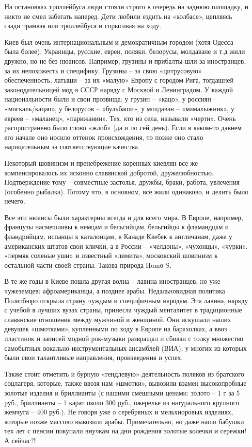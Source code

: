 На остановках троллейбуса люди стояли строго в очередь на заднюю площадку, и
никто не смел забегать наперед. Дети любили ездить на «колбасе», цепляясь сзади
трамвая или троллейбуса и спрыгивая на ходу. 

Киев был очень интернациональным и демократичным городом (хотя Одесса была
более). Украинцы, русские, евреи, поляки, белорусы, молдаване и т.д жили
дружно, но не без нюансов. Например, грузины и прибалты шли за иностранцев, за
их непохожесть и специфику. Грузины – за свою «цитрусовую» обеспеченность,
латыши – за их «малую» Европу с городом Рига, тогдашней законодательницей мод в
СССР наряду с Москвой и Ленинградом. У каждой национальности были и свои
прозвища: у грузин – «кацо», у россиян – «москаль/кацап», у белорусов –
«бульбаши», у молдаван – «мамалыжник», у евреев – «маланец», «парижанин». Тех,
кто из села, называли «черти». Очень распространено было слово «жлоб» (да и по
сей день). Если в каком-то давнем его начале оно носило оттенок происхождения,
то позже оно стало нарицательным за соответствующие качества. 

Некоторый шовинизм и пренебрежение коренных киевлян все же компенсировалось их
исконно славянской добротой, дружелюбностью. Подтверждение тому – совместные
застолья, дружбы, браки, работа, увлечения (особенно рыбалка). Потому что, в
основном, все жили одинаково, и делить было нечего. 

Все эти нюансы были характерны всегда и для всего мира. В Европе, например,
французы насмешливы к немцам и бельгийцам, бельгийцы к фламандцам и
фландрийцам, испанцы к каталонцам, в Канаде Квебек к англичанам, даже у
американских штатов свои клички, а в России – «челдоны», «чухонцы», «чурки»,
«пермяк соленые уши» и известный «лимита», московский шовинизм к остальной
части своей страны. Такова природа Homо S. 

В те же годы в Киеве пошла другая волна – лавина иностранцев, но уже
чужеземцев: афроамериканцы, а позднее арабы. Недальновидная политика Политбюро
открыла страну чуждым и специфичным народам. Эта лавина, наряду с учебой в
лучших вузах страны, принесла чуждый менталитет в традиционные славянские
отношения между мужчиной и женщиной. Они искушали наших девушек «шмотками»,
купленными по ходу в Европе на барахолках, а ввоз пластинок и записей модной
рок-музыки развращал и сбивал с толку множество самобытных
вокально-инструментальных ансамблей (ВИА), у многих из которых были свои
талантливые направления, произведения и успех. 

Также стоит отметить и бурную «гендлевую» деятельность поляков из братского
соцлагеря, которые, также ввозя нам «шмотки», вывозили взамен высокопробные
золотые изделия и бриллианты (с нашими смешными ценами: золото – 1 г за 5 руб.,
бриллианты – 1 карат около 300 руб., ожерелье из натурального крупного жемчуга
– 400 руб.). Не говоря уже о серебряных и мельхиоровых изделиях, которые позже
массово вывозили арабы. Примечательно, но даже наши бабушки тех лет с пенсии
покупали внучкам на дни рождения золотые колечки и сережки! А сейчас?! 

